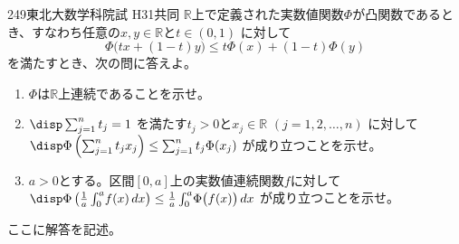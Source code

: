 \begin{thm}{249}{}{東北大数学科院試 H31共同}
 $\mathbb{R}$上で定義された実数値関数$\Phi$が凸関数であるとき、すなわち任意の$x,y\in\mathbb{R}$と$t\in (0,1)$ に対して
 \[ \Phi\bigl(tx+(1-t)y\bigr)\le t\Phi(x)+(1-t)\Phi(y) \]
 を満たすとき、次の問に答えよ。
 \begin{enumerate}
  \item $\Phi$は$\mathbb{R}$上連続であることを示せ。
  \item $\disp \sum_{j=1}^n t_j=1$ を満たす$t_j>0$と$x_j\in\mathbb{R}$ $(j=1,2,\dots, n)$ に対して $\disp \Phi\left(\sum_{j=1}^nt_jx_j\right)\le \sum_{j=1}^nt_j\Phi(x_j)$ が成り立つことを示せ。
  \item $a>0$とする。区間$[0,a]$上の実数値連続関数$f$に対して $\disp \Phi\left(\frac{1}{a}\int_0^a\!f(x)\,dx\right)\le\frac{1}{a}\int_0^a\!\Phi\bigl(f(x)\bigr)\,dx$ が成り立つことを示せ。
 \end{enumerate}
\end{thm}

ここに解答を記述。